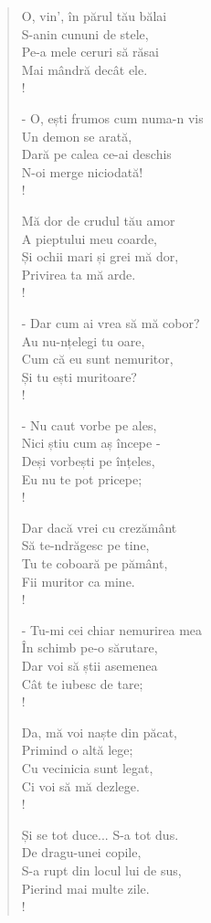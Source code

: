 \documentclass{article}
\begin{document}
\begin{small}
\begin{multicols}{3}
\begin{verse}
O, vin', în părul tău bălai \\
S-anin cununi de stele, \\
Pe-a mele ceruri să răsai \\
Mai mândră decât ele. \\!

- O, ești frumos cum numa-n vis \\
Un demon se arată, \\
Dară pe calea ce-ai deschis \\
N-oi merge niciodată! \\!

Mă dor de crudul tău amor \\
A pieptului meu coarde, \\
Și ochii mari și grei mă dor, \\
Privirea ta mă arde. \\!

- Dar cum ai vrea să mă cobor? \\
Au nu-nțelegi tu oare, \\
Cum că eu sunt nemuritor, \\
Și tu ești muritoare? \\!

- Nu caut vorbe pe ales, \\
Nici știu cum aș începe - \\
Deși vorbești pe înțeles, \\
Eu nu te pot pricepe; \\!

Dar dacă vrei cu crezământ \\
Să te-ndrăgesc pe tine, \\
Tu te coboară pe pământ, \\
Fii muritor ca mine. \\!

- Tu-mi cei chiar nemurirea mea \\
În schimb pe-o sărutare, \\
Dar voi să știi asemenea \\
Cât te iubesc de tare; \\!

Da, mă voi naște din păcat, \\
Primind o altă lege; \\
Cu vecinicia sunt legat, \\
Ci voi să mă dezlege. \\!

Și se tot duce... S-a tot dus. \\
De dragu-unei copile, \\
S-a rupt din locul lui de sus, \\
Pierind mai multe zile. \\!


\end{verse}
\end{multicols}
\end{small}
\end{document}
